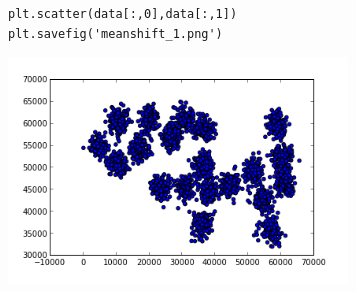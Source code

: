 \documentclass[12pt,fleqn]{article}\usepackage{../../common}
\begin{document}
\begin{verbatim}
plt.scatter(data[:,0],data[:,1])
plt.savefig('meanshift_1.png')
\end{verbatim}

\includegraphics[height=6cm]{meanshift_1.png}
\end{document}
